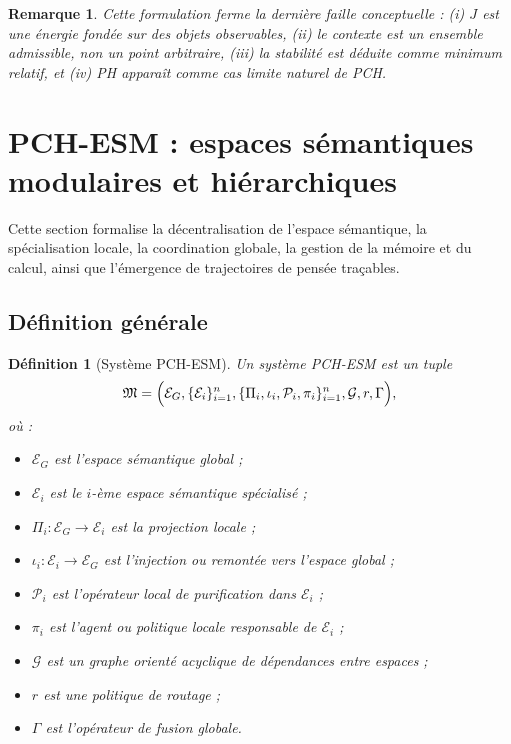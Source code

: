 \documentclass[11pt,a4paper]{article}
\newtheorem{definition}{Définition}[section]
\newtheorem{remark}{Remarque}[section]
\newcommand{\E}{\mathcal E}
\newcommand{\Pcal}{\mathcal P}
\newcommand{\Gcal}{\mathcal G}
\newcommand{\1}{\mathbf 1}
\begin{document}
\begin{remark}
Cette formulation ferme la dernière faille conceptuelle :
(i) \(J\) est une énergie fondée sur des objets observables,
(ii) le contexte est un ensemble admissible, non un point arbitraire,
(iii) la stabilité est déduite comme minimum relatif,
et (iv) PH apparaît comme cas limite naturel de PCH.
\end{remark}

\section{PCH-ESM : espaces sémantiques modulaires et hiérarchiques}

Cette section formalise la décentralisation de l'espace sémantique, la spécialisation locale, la coordination globale, la gestion de la mémoire et du calcul, ainsi que l'émergence de trajectoires de pensée traçables.

\subsection{Définition générale}

\begin{definition}[Système PCH-ESM]
Un système PCH-ESM est un tuple
\[
\mathfrak M
=
\Bigl(
\E_G,
\{\E_i\}_{i=1}^n,
\{\Pi_i,\iota_i,\Pcal_i,\pi_i\}_{i=1}^n,
\Gcal,
r,
\Gamma
\Bigr),
\]
où :

\begin{itemize}[leftmargin=2em]
    \item \(\E_G\) est l'espace sémantique global ;
    \item \(\E_i\) est le \(i\)-ème espace sémantique spécialisé ;
    \item \(\Pi_i:\E_G\to\E_i\) est la projection locale ;
    \item \(\iota_i:\E_i\to\E_G\) est l'injection ou remontée vers l'espace global ;
    \item \(\Pcal_i\) est l'opérateur local de purification dans \(\E_i\) ;
    \item \(\pi_i\) est l'agent ou politique locale responsable de \(\E_i\) ;
    \item \(\Gcal\) est un graphe orienté acyclique de dépendances entre espaces ;
    \item \(r\) est une politique de routage ;
    \item \(\Gamma\) est l'opérateur de fusion globale.
\end{itemize}
\end{definition}
\end{document}
